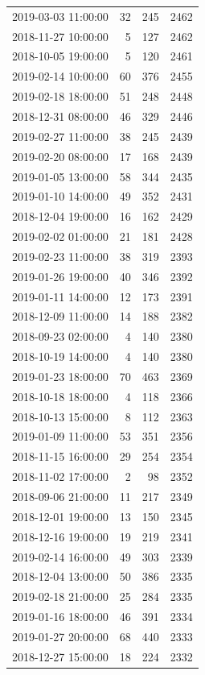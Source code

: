 \begin{tabular}{lrrr}
2019-03-03 11:00:00 & 32 & 245 & 2462 \\
2018-11-27 10:00:00 & 5 & 127 & 2462 \\
2018-10-05 19:00:00 & 5 & 120 & 2461 \\
2019-02-14 10:00:00 & 60 & 376 & 2455 \\
2019-02-18 18:00:00 & 51 & 248 & 2448 \\
2018-12-31 08:00:00 & 46 & 329 & 2446 \\
2019-02-27 11:00:00 & 38 & 245 & 2439 \\
2019-02-20 08:00:00 & 17 & 168 & 2439 \\
2019-01-05 13:00:00 & 58 & 344 & 2435 \\
2019-01-10 14:00:00 & 49 & 352 & 2431 \\
2018-12-04 19:00:00 & 16 & 162 & 2429 \\
2019-02-02 01:00:00 & 21 & 181 & 2428 \\
2019-02-23 11:00:00 & 38 & 319 & 2393 \\
2019-01-26 19:00:00 & 40 & 346 & 2392 \\
2019-01-11 14:00:00 & 12 & 173 & 2391 \\
2018-12-09 11:00:00 & 14 & 188 & 2382 \\
2018-09-23 02:00:00 & 4 & 140 & 2380 \\
2018-10-19 14:00:00 & 4 & 140 & 2380 \\
2019-01-23 18:00:00 & 70 & 463 & 2369 \\
2018-10-18 18:00:00 & 4 & 118 & 2366 \\
2018-10-13 15:00:00 & 8 & 112 & 2363 \\
2019-01-09 11:00:00 & 53 & 351 & 2356 \\
2018-11-15 16:00:00 & 29 & 254 & 2354 \\
2018-11-02 17:00:00 & 2 & 98 & 2352 \\
2018-09-06 21:00:00 & 11 & 217 & 2349 \\
2018-12-01 19:00:00 & 13 & 150 & 2345 \\
2018-12-16 19:00:00 & 19 & 219 & 2341 \\
2019-02-14 16:00:00 & 49 & 303 & 2339 \\
2018-12-04 13:00:00 & 50 & 386 & 2335 \\
2019-02-18 21:00:00 & 25 & 284 & 2335 \\
2019-01-16 18:00:00 & 46 & 391 & 2334 \\
2019-01-27 20:00:00 & 68 & 440 & 2333 \\
2018-12-27 15:00:00 & 18 & 224 & 2332 \\

\end{tabular}
